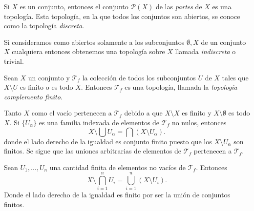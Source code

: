 \begin{ejem} 
	Si $ X $ es un conjunto, entonces el
	conjunto $ \mathcal{P}(X) $ de las
	\emph{partes} de $ X $ es una topología. Esta
	topología, en la que todos los conjuntos son
	abiertos, se conoce como la topología
	\emph{discreta}.  \end{ejem}

\begin{ejem} Si
	consideramos como abiertos solamente a los
	subconjuntos $ \emptyset,X $ de un conjunto $ X
	$ cualquiera entonces obtenemos una topología
	sobre $ X $ llamada \emph{indiscreta} o
	trivial.  \end{ejem}

\begin{ejem} Sean $ X $ un
	conjunto y $ \mathcal{T}_f $ la colección de
	todos los subconjuntos $ U $ de $ X $ tales que
	$ X\setminus U $ es finito o es todo $ X $.
	Entonces $ \mathcal{T}_f $ es una topología,
	llamada la \emph{topología complemento finito}.

	Tanto $ X $ como el vacío pertenecen a $
	\mathcal{T}_f $ debido a que $ X\setminus X $
	es finito y $ X\setminus\emptyset $ es todo $ X
	$. Si $\{ U_\alpha \}$ es una familia indexada
	de elementos de $ \mathcal{T}_f $ no nulos,
	entonces\footnotemark \[ X\setminus\bigcup
	U_\alpha = \bigcap (X\setminus U_\alpha).  \]
	 donde el lado derecho de la igualdad
	es conjunto finito puesto que los $ X\setminus
	U_\alpha $ son finitos. Se sigue que las
	uniones arbitrarias de elementos de $
	\mathcal{T}_f $ pertenecen a $ \mathcal{T}_f $.

	Sean $ U_1,\dots,U_n $ una cantidad finita de
	elementos no vacíos de $ \mathcal{T}_f $.
	Entonces \[ X\setminus\bigcap_{i=1}^n U_i =
		\bigcup_{i=1}^n (X\setminus U_i).  \]
	Donde el lado derecho de la igualdad es finito
por ser la unión de conjuntos finitos.  \end{ejem}





